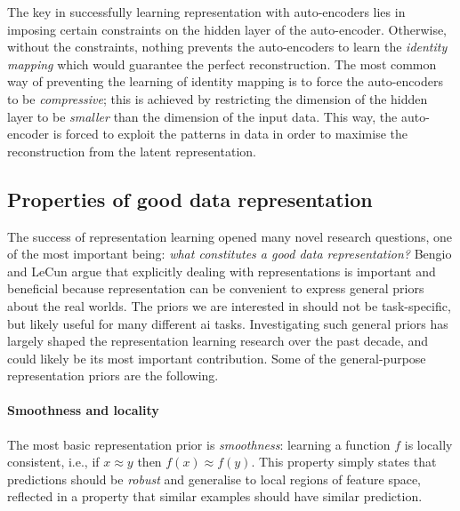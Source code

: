 The key in successfully learning representation with auto-encoders lies in imposing certain constraints on the hidden layer of the auto-encoder.
Otherwise, without the constraints, nothing prevents the auto-encoders to learn the \textit{identity mapping} which would guarantee the perfect reconstruction.
The most common way of preventing the learning of identity mapping is to force the auto-encoders to be \textit{compressive}; this is achieved by restricting the dimension of the hidden layer to be \textit{smaller} than the dimension of the input data.
This way, the auto-encoder is forced to exploit the patterns in data in order to maximise the reconstruction from the latent representation.







\subsection{Properties of good data representation}



The success of representation learning opened many novel research questions, one of the most important being: \textit{what constitutes a good data representation?}
Bengio and LeCun \cite{Bengio2013RLR} argue that explicitly dealing with representations is important and beneficial because representation can be convenient to express general priors about the real worlds.
The priors we are interested in should not be task-specific, but likely useful for many different \gls{ai} tasks.
Investigating such general priors has largely shaped the representation learning research over the past decade, and could likely be its most important contribution.
Some of the general-purpose representation priors are the following.



\paragraph{\textbf{Smoothness and locality}} 
The most basic representation prior is \textit{smoothness}: learning a function $f$ is locally consistent, i.e., if $ x \approx y$ then $f(x) \approx f(y)$.
This property simply states that predictions should be \textit{robust} and generalise to local regions of feature space, reflected in a property that similar examples should have similar prediction.




